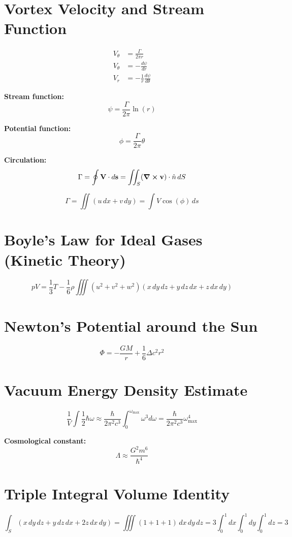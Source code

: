 \documentclass{article}
\begin{document}
    \section*{Vortex Velocity and Stream Function}

    \begin{align*}
        V_\theta &= \frac{\Gamma}{2\pi r} \\
        V_\theta &= - \frac{d\psi}{dr} \\
        V_r &= -\frac{1}{r} \frac{d\psi}{d\theta}
    \end{align*}

    \textbf{Stream function:}
    \[
        \psi = \frac{\Gamma}{2\pi} \ln(r)
    \]

    \textbf{Potential function:}
    \[
        \phi = \frac{\Gamma}{2\pi} \theta
    \]

    \textbf{Circulation:}
    \[
        \Gamma = \oint \vb{V} \cdot d\vb{s} = \iint_S (\curl{\vb{v}}) \cdot \hat{n} \, dS
    \]

    \[
        \Gamma = \iint (u \, dx + v \, dy) = \int V \cos(\phi) \, ds
    \]

    \section*{Boyle's Law for Ideal Gases (Kinetic Theory)}

    \[
        pV = \frac{1}{3} T - \frac{1}{6} \rho \iiint (u^2 + v^2 + w^2) (x \, dy \, dz + y \, dz \, dx + z \, dx \, dy)
    \]

    \section*{Newton's Potential around the Sun}

    \[
        \Phi = - \frac{GM}{r} + \frac{1}{6} \Delta c^2 r^2
    \]

    \section*{Vacuum Energy Density Estimate}

    \[
        \frac{1}{V} \int \frac{1}{2} \hbar \omega \approx \frac{\hbar}{2\pi^2 c^3} \int_0^{\omega_{\text{max}}} \omega^3 d\omega
        = \frac{\hbar}{2\pi^2 c^3} \omega_{\text{max}}^4
    \]

    \textbf{Cosmological constant:}
    \[
        \Lambda \approx \frac{G^2 m^6}{\hbar^4}
    \]

    \section*{Triple Integral Volume Identity}

    \[
        \int_S (x\,dy\,dz + y\,dz\,dx + 2z\,dx\,dy)
        = \iiint (1+1+1) \, dx \, dy \, dz
        = 3 \int_0^1 dx \int_0^1 dy \int_0^1 dz = \boxed{3}
    \]
\end{document}
